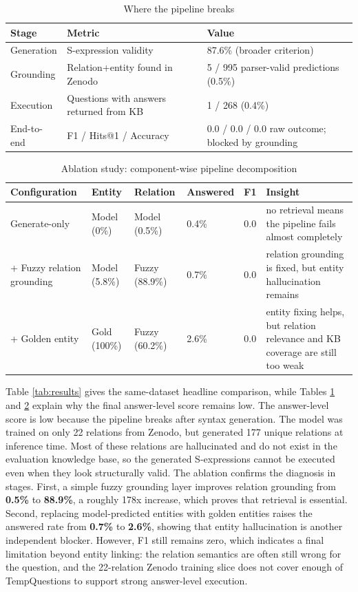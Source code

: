 \documentclass[a4paper,11pt]{article}
\begin{document}
\begin{table}[H]
\centering
\caption{Where the pipeline breaks}
\label{tab:pipeline-breakdown}
\begin{tabular}{p{3.2cm}p{4.2cm}p{5.6cm}}
\toprule
\textbf{Stage} & \textbf{Metric} & \textbf{Value} \\
\midrule
Generation & S-expression validity & 87.6\% (broader criterion) \\
Grounding & Relation+entity found in Zenodo & 5 / 995 parser-valid predictions (0.5\%) \\
Execution & Questions with answers returned from KB & 1 / 268 (0.4\%) \\
End-to-end & F1 / Hits@1 / Accuracy & 0.0 / 0.0 / 0.0 raw outcome; blocked by grounding \\
\bottomrule
\end{tabular}
\end{table}

\begin{table}[H]
\centering
\caption{Ablation study: component-wise pipeline decomposition}
\label{tab:ablation}
\begin{tabular}{p{3.4cm}p{2.1cm}p{2.2cm}p{2cm}p{1.2cm}p{3.1cm}}
\toprule
\textbf{Configuration} & \textbf{Entity} & \textbf{Relation} & \textbf{Answered} & \textbf{F1} & \textbf{Insight} \\
\midrule
Generate-only & Model (0\%) & Model (0.5\%) & 0.4\% & 0.0 & no retrieval means the pipeline fails almost completely \\
+ Fuzzy relation grounding & Model (5.8\%) & Fuzzy (88.9\%) & 0.7\% & 0.0 & relation grounding is fixed, but entity hallucination remains \\
+ Golden entity & Gold (100\%) & Fuzzy (60.2\%) & 2.6\% & 0.0 & entity fixing helps, but relation relevance and KB coverage are still too weak \\
\bottomrule
\end{tabular}
\end{table}

\noindent Table \ref{tab:results} gives the same-dataset headline comparison, while Tables \ref{tab:pipeline-breakdown} and \ref{tab:ablation} explain why the final answer-level score remains low. The answer-level score is low because the pipeline breaks after syntax generation. The model was trained on only 22 relations from Zenodo, but generated 177 unique relations at inference time. Most of these relations are hallucinated and do not exist in the evaluation knowledge base, so the generated S-expressions cannot be executed even when they look structurally valid. The ablation confirms the diagnosis in stages. First, a simple fuzzy grounding layer improves relation grounding from \textbf{0.5\%} to \textbf{88.9\%}, a roughly 178x increase, which proves that retrieval is essential. Second, replacing model-predicted entities with golden entities raises the answered rate from \textbf{0.7\%} to \textbf{2.6\%}, showing that entity hallucination is another independent blocker. However, F1 still remains zero, which indicates a final limitation beyond entity linking: the relation semantics are often still wrong for the question, and the 22-relation Zenodo training slice does not cover enough of TempQuestions to support strong answer-level execution.
\end{document}
